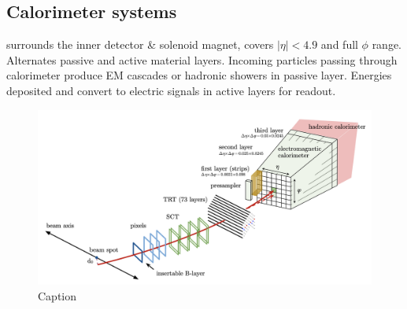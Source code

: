 \documentclass[../thesis.tex]{subfiles}
\begin{document}
\subsection{Calorimeter systems}
surrounds the inner detector \& solenoid magnet, covers $|\eta|<4.9$ and full $\phi$ range. Alternates passive and active material layers. Incoming particles passing through calorimeter produce EM cascades or hadronic showers in passive layer. Energies deposited and convert to electric signals in active layers for readout.

\begin{figure}[!htbp]
\begin{center}
\includegraphics[width=\linewidth]{fig/reco_electron.png}
\caption[Caption]{\label{fig:reco:electron}Caption \citep{reco:electron_id}}
\end{center}
\end{figure}
\end{document}
